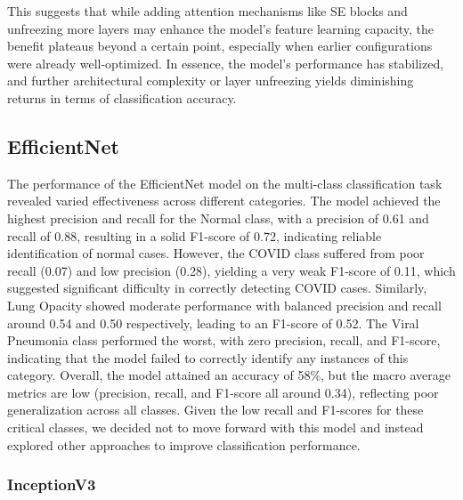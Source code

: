 \documentclass{article}
\begin{document}
This suggests that while adding attention mechanisms like SE blocks and unfreezing more layers may enhance the model’s feature learning capacity, the benefit plateaus beyond a certain point, especially when earlier configurations were already well-optimized. In essence, the model’s performance has stabilized, and further architectural complexity or layer unfreezing yields diminishing returns in terms of classification accuracy.

\subsection{EfficientNet}
The performance of the EfficientNet model on the multi-class classification task revealed varied effectiveness across different categories. The model achieved the highest precision and recall for the Normal class, with a precision of 0.61 and recall of 0.88, resulting in a solid F1-score of 0.72, indicating reliable identification of normal cases. However, the COVID class suffered from poor recall (0.07) and low precision (0.28), yielding a very weak F1-score of 0.11, which suggested significant difficulty in correctly detecting COVID cases. Similarly, Lung Opacity showed moderate performance with balanced precision and recall around 0.54 and 0.50 respectively, leading to an F1-score of 0.52. The Viral Pneumonia class performed the worst, with zero precision, recall, and F1-score, indicating that the model failed to correctly identify any instances of this category. Overall, the model attained an accuracy of 58\%, but the macro average metrics are low (precision, recall, and F1-score all around 0.34), reflecting poor generalization across all classes. Given the low recall and F1-scores for these critical classes, we decided not to move forward with this model and instead explored other approaches to improve classification performance.

\subsubsection{InceptionV3}
\end{document}
